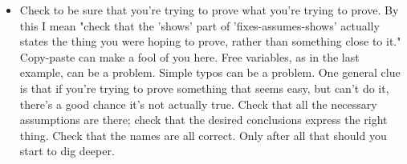 \begin{itemize}
\item Check to be sure that you're trying to prove what you're trying to prove. By this I mean "check that the 'shows' part of 'fixes-assumes-shows' actually states the thing you were hoping to prove, rather than something close to it." Copy-paste can make a fool of you here. Free variables, as in the last example, can be a problem. Simple typos can be a problem. One general clue is that if you're trying to prove something that seems easy, but  can't do it, there's a good chance it's not actually true. Check that all the necessary assumptions are there; check that the desired conclusions express the right thing. Check that the names are all correct. Only after all that should you start to dig deeper. 

\end{itemize}